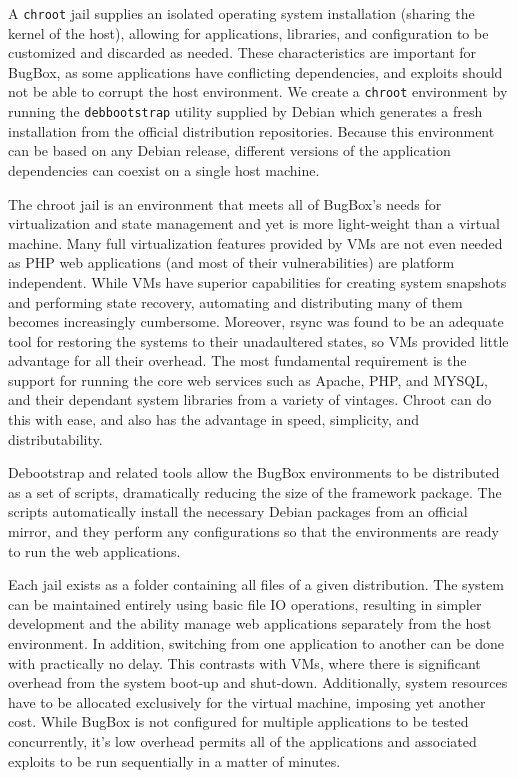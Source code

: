 \documentclass[letterpaper,twocolumn,10pt]{article}
\begin{document}
A \texttt{chroot} jail supplies an isolated operating system installation (sharing the kernel of the host), allowing for applications, libraries, and configuration to be customized and discarded as needed. These characteristics are important for BugBox, as some applications have conflicting dependencies, and exploits should not be able to corrupt the host environment. We create a \texttt{chroot} environment by running the \texttt{debbootstrap} utility supplied by Debian which generates a fresh installation from the official distribution repositories. Because this environment can be based on any Debian release, different versions of the application dependencies can coexist on a single host machine. 

The chroot jail is an environment that meets all of BugBox's needs for virtualization and state management and yet is more light-weight than a virtual machine. Many full virtualization features provided by VMs are not even needed as PHP web applications (and most of their vulnerabilities) are platform independent. While VMs have superior capabilities for creating system snapshots and performing state recovery, automating and distributing many of them becomes increasingly cumbersome. Moreover, rsync was found to be an adequate tool for restoring the systems to their unadaultered states, so VMs provided little advantage for all their overhead. The most fundamental requirement is the support for running the core web services such as Apache, PHP, and MYSQL, and their dependant system libraries from a variety of vintages. Chroot can do this with ease, and also has the advantage in speed, simplicity, and distributability.

Debootstrap and related tools allow the BugBox environments to be distributed as a set of scripts, dramatically reducing the size of the framework package. The scripts automatically install the necessary Debian packages from an official mirror, and they perform any configurations so that the environments are ready to run the web applications.

Each jail exists as a folder containing all files of a given distribution. The system can be maintained entirely using basic file IO operations, resulting in simpler development and the ability manage web applications separately from the host environment. In addition, switching from one application to another can be done with practically no delay. This contrasts with VMs, where there is significant overhead from the system boot-up and shut-down. Additionally, system resources have to be allocated exclusively for the virtual machine, imposing yet another cost. While BugBox is not configured for multiple applications to be tested concurrently, it's low overhead permits all of the applications and associated exploits to be run sequentially in a matter of minutes. 
\end{document}
